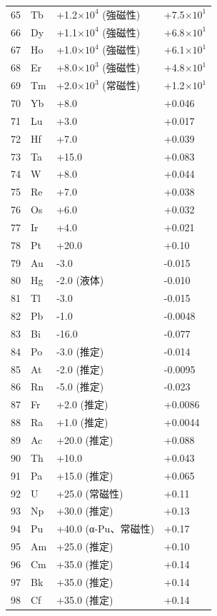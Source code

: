 \documentclass[11pt,a4paper]{article}
\theoremstyle{remark}
\begin{document}
\begin{longtable}{p{0.6cm}p{1.2cm}p{2.5cm}p{2.5cm}}
		65 & Tb & +1.2\(\times10^4\) (強磁性) & +7.5\(\times10^1\) \\
		66 & Dy & +1.1\(\times10^4\) (強磁性) & +6.8\(\times10^1\) \\
		67 & Ho & +1.0\(\times10^4\) (強磁性) & +6.1\(\times10^1\) \\
		68 & Er & +8.0\(\times10^3\) (強磁性) & +4.8\(\times10^1\) \\
		69 & Tm & +2.0\(\times10^3\) (常磁性) & +1.2\(\times10^1\) \\
		70 & Yb & +8.0 & +0.046 \\
		71 & Lu & +3.0 & +0.017 \\
		72 & Hf & +7.0 & +0.039 \\
		73 & Ta & +15.0 & +0.083 \\
		74 & W  & +8.0 & +0.044 \\
		75 & Re & +7.0 & +0.038 \\
		76 & Os & +6.0 & +0.032 \\
		77 & Ir & +4.0 & +0.021 \\
		78 & Pt & +20.0 & +0.10 \\
		79 & Au & -3.0 & -0.015 \\
		80 & Hg & -2.0 (液体) & -0.010 \\
		81 & Tl & -3.0 & -0.015 \\
		82 & Pb & -1.0 & -0.0048 \\
		83 & Bi & -16.0 & -0.077 \\
		84 & Po & -3.0 (推定) & -0.014 \\
		85 & At & -2.0 (推定) & -0.0095 \\
		86 & Rn & -5.0 (推定) & -0.023 \\
		87 & Fr & +2.0 (推定) & +0.0086 \\
		88 & Ra & +1.0 (推定) & +0.0044 \\
		89 & Ac & +20.0 (推定) & +0.088 \\
		90 & Th & +10.0 & +0.043 \\
		91 & Pa & +15.0 (推定) & +0.065 \\
		92 & U  & +25.0 (常磁性) & +0.11 \\
		93 & Np & +30.0 (推定) & +0.13 \\
		94 & Pu & +40.0 (α-Pu、常磁性) & +0.17 \\
		95 & Am & +25.0 (推定) & +0.10 \\
		96 & Cm & +35.0 (推定) & +0.14 \\
		97 & Bk & +35.0 (推定) & +0.14 \\
		98 & Cf & +35.0 (推定) & +0.14 \\

\end{longtable}
\end{document}
